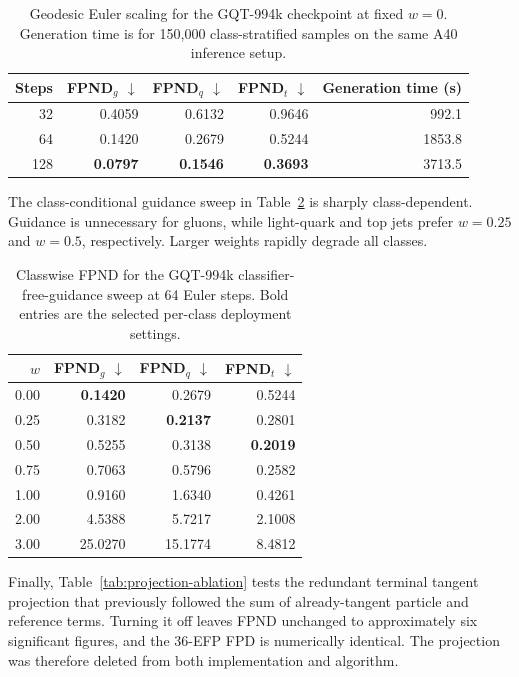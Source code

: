 \documentclass[10pt]{article}
\begin{document}
\begin{table}[H]
\centering
\caption{Geodesic Euler scaling for the GQT-994k checkpoint at fixed $w=0$. Generation
time is for 150,000 class-stratified samples on the same A40 inference setup.}
\label{tab:euler-ablation}
\small
\begin{tabular}{rrrrr}
\toprule
Steps & FPND$_g$ $\downarrow$ & FPND$_q$ $\downarrow$ & FPND$_t$ $\downarrow$ & Generation time (s) \\
\midrule
32  & 0.4059 & 0.6132 & 0.9646 &  992.1 \\
64  & 0.1420 & 0.2679 & 0.5244 & 1853.8 \\
128 & \textbf{0.0797} & \textbf{0.1546} & \textbf{0.3693} & 3713.5 \\
\bottomrule
\end{tabular}
\end{table}

The class-conditional guidance sweep in Table~\ref{tab:cfg-sweep} is sharply
class-dependent. Guidance is unnecessary for gluons, while light-quark and top jets
prefer $w=0.25$ and $w=0.5$, respectively. Larger weights rapidly degrade all classes.

\begin{table}[H]
\centering
\caption{Classwise FPND for the GQT-994k classifier-free-guidance sweep at 64 Euler
steps. Bold entries are the selected per-class deployment settings.}
\label{tab:cfg-sweep}
\small
\begin{tabular}{rrrr}
\toprule
$w$ & FPND$_g$ $\downarrow$ & FPND$_q$ $\downarrow$ & FPND$_t$ $\downarrow$ \\
\midrule
0.00 & \textbf{0.1420} & 0.2679 & 0.5244 \\
0.25 & 0.3182 & \textbf{0.2137} & 0.2801 \\
0.50 & 0.5255 & 0.3138 & \textbf{0.2019} \\
0.75 & 0.7063 & 0.5796 & 0.2582 \\
1.00 & 0.9160 & 1.6340 & 0.4261 \\
2.00 & 4.5388 & 5.7217 & 2.1008 \\
3.00 & 25.0270 & 15.1774 & 8.4812 \\
\bottomrule
\end{tabular}
\end{table}

Finally, Table~\ref{tab:projection-ablation} tests the redundant terminal tangent
projection that previously followed the sum of already-tangent particle and reference
terms. Turning it off leaves FPND unchanged to approximately six significant figures,
and the 36-EFP FPD is numerically identical. The projection was therefore deleted from
both implementation and algorithm.
\end{document}

